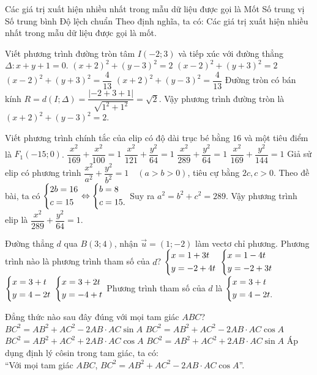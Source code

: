 \begin{ex}%
	Các giá trị xuất hiện nhiều nhất trong mẫu dữ liệu được gọi là
	\choice
	{\True Mốt}
	{Số trung vị}
	{Số trung bình}
	{Độ lệch chuẩn}
	\loigiai
	{
	Theo định nghĩa, ta có: Các giá trị xuất hiện nhiều nhất trong mẫu dữ liệu được gọi là mốt.
	}
\end{ex}
\begin{ex}%
	Viết phương trình đường tròn tâm $I(-2;3)$ và tiếp xúc với đường thẳng $\Delta: x+y+1=0$.
	\choice
	{\True $(x+2)^2+(y-3)^2=2$}
	{$(x-2)^2+(y+3)^2=2$}
	{$(x-2)^2+(y+3)^2=\dfrac{4}{13}$}
	{$(x+2)^2+(y-3)^2=\dfrac{4}{13}$}
	\loigiai
{
Đường tròn có bán kính $R=d(I;\Delta)=\dfrac{|-2+3+1|}{\sqrt{1^2+1^2}}=\sqrt{2}$. Vậy phương trình đường tròn là $(x+2)^2+(y-3)^2=2$.
}	
\end{ex}
\begin{ex}%
	Viết phương trình chính tắc của elip có độ dài trục bé bằng $16$ và một tiêu điểm là $F_1(-15;0)$.
	\choice
	{$\dfrac{x^2}{169}+\dfrac{x^2}{100}=1$}
	{$\dfrac{x^2}{121}+\dfrac{y^2}{64}=1$}
	{\True $\dfrac{x^2}{289}+\dfrac{y^2}{64}=1$}
	{$\dfrac{x^2}{169}+\dfrac{y^2}{144}=1$}
	\loigiai
{Giả sử elip có phương trình $\dfrac{x^2}{a^2}+\dfrac{y^2}{b^2}=1\quad (a>b>0)$, tiêu cự bằng $2c, c>0$.
Theo đề bài, ta có $\left\{\begin{aligned}&2b=16\\&c=15\end{aligned}\right.\Leftrightarrow\left\{\begin{aligned}&b=8\\&c=15.\end{aligned}\right.$
Suy ra $a^2=b^2+c^2=289$. Vậy phương trình elip là $\dfrac{x^2}{289}+\dfrac{y^2}{64}=1$.
}
\end{ex}
\begin{ex}%
	Đường thẳng $d$ qua $B(3;4)$, nhận $\vec{u}=(1;-2)$ làm vectơ chỉ phương. Phương trình nào là phương trình tham số của $d$?
	\choice
	{ $\left\{\begin{aligned}& x=1+3t\\& y=-2+4t\end{aligned}\right.$}
	{$\left\{\begin{aligned}& x=1-4t\\& y=-2+3t\end{aligned}\right.$}
	{\True $\left\{\begin{aligned}& x=3+t\\& y=4-2t\end{aligned}\right.$}
	{$\left\{\begin{aligned}& x=3+2t\\& y=-4+t\end{aligned}\right.$}
	\loigiai
{
Phương trình tham số của $d$ là $\left\{\begin{aligned}& x=3+t\\& y=4-2t.\end{aligned}\right.$
}
\end{ex}
\begin{ex}%
	Đẳng thức nào sau đây đúng với mọi tam giác $ABC$?
	\choice
	{$BC^2=AB^2+AC^2-2AB\cdot AC\sin A$}
	{\True $BC^2=AB^2+AC^2-2AB\cdot AC\cos A$}
	{$BC^2=AB^2+AC^2+2AB\cdot AC\cos A$}
	{$BC^2=AB^2+AC^2+2AB\cdot AC\sin A$}
	\loigiai
{Áp dụng định lý côsin trong tam giác, ta có:\\
``Với mọi tam giác $ABC$, $BC^2=AB^2+AC^2-2AB\cdot AC\cos A$''.
}
\end{ex}
